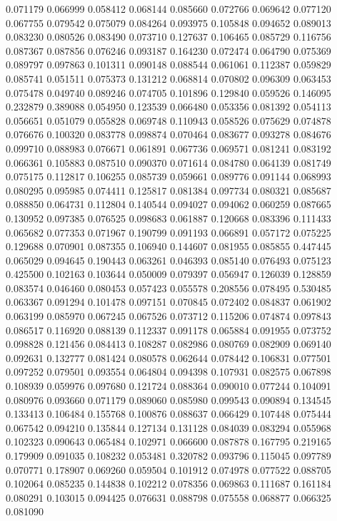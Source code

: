 0.071179
0.066999
0.058412
0.068144
0.085660
0.072766
0.069642
0.077120
0.067755
0.079542
0.075079
0.084264
0.093975
0.105848
0.094652
0.089013
0.083230
0.080526
0.083490
0.073710
0.127637
0.106465
0.085729
0.116756
0.087367
0.087856
0.076246
0.093187
0.164230
0.072474
0.064790
0.075369
0.089797
0.097863
0.101311
0.090148
0.088544
0.061061
0.112387
0.059829
0.085741
0.051511
0.075373
0.131212
0.068814
0.070802
0.096309
0.063453
0.075478
0.049740
0.089246
0.074705
0.101896
0.129840
0.059526
0.146095
0.232879
0.389088
0.054950
0.123539
0.066480
0.053356
0.081392
0.054113
0.056651
0.051079
0.055828
0.069748
0.110943
0.058526
0.075629
0.074878
0.076676
0.100320
0.083778
0.098874
0.070464
0.083677
0.093278
0.084676
0.099710
0.088983
0.076671
0.061891
0.067736
0.069571
0.081241
0.083192
0.066361
0.105883
0.087510
0.090370
0.071614
0.084780
0.064139
0.081749
0.075175
0.112817
0.106255
0.085739
0.059661
0.089776
0.091144
0.068993
0.080295
0.095985
0.074411
0.125817
0.081384
0.097734
0.080321
0.085687
0.088850
0.064731
0.112804
0.140544
0.094027
0.094062
0.060259
0.087665
0.130952
0.097385
0.076525
0.098683
0.061887
0.120668
0.083396
0.111433
0.065682
0.077353
0.071967
0.190799
0.091193
0.066891
0.057172
0.075225
0.129688
0.070901
0.087355
0.106940
0.144607
0.081955
0.085855
0.447445
0.065029
0.094645
0.190443
0.063261
0.046393
0.085140
0.076493
0.075123
0.425500
0.102163
0.103644
0.050009
0.079397
0.056947
0.126039
0.128859
0.083574
0.046460
0.080453
0.057423
0.055578
0.208556
0.078495
0.530485
0.063367
0.091294
0.101478
0.097151
0.070845
0.072402
0.084837
0.061902
0.063199
0.085970
0.067245
0.067526
0.073712
0.115206
0.074874
0.097843
0.086517
0.116920
0.088139
0.112337
0.091178
0.065884
0.091955
0.073752
0.098828
0.121456
0.084413
0.108287
0.082986
0.080769
0.082909
0.069140
0.092631
0.132777
0.081424
0.080578
0.062644
0.078442
0.106831
0.077501
0.097252
0.079501
0.093554
0.064804
0.094398
0.107931
0.082575
0.067898
0.108939
0.059976
0.097680
0.121724
0.088364
0.090010
0.077244
0.104091
0.080976
0.093660
0.071179
0.089060
0.085980
0.099543
0.090894
0.134545
0.133413
0.106484
0.155768
0.100876
0.088637
0.066429
0.107448
0.075444
0.067542
0.094210
0.135844
0.127134
0.131128
0.084039
0.083294
0.055968
0.102323
0.090643
0.065484
0.102971
0.066600
0.087878
0.167795
0.219165
0.179909
0.091035
0.108232
0.053481
0.320782
0.093796
0.115045
0.097789
0.070771
0.178907
0.069260
0.059504
0.101912
0.074978
0.077522
0.088705
0.102064
0.085235
0.144838
0.102212
0.078356
0.069863
0.111687
0.161184
0.080291
0.103015
0.094425
0.076631
0.088798
0.075558
0.068877
0.066325
0.081090
